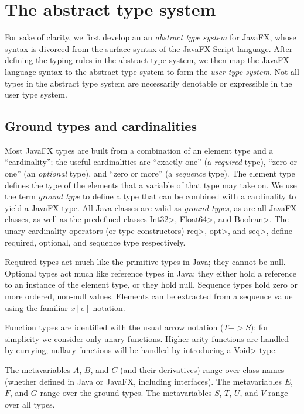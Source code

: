 \documentclass{article}
\begin{document}
\section{The abstract type system}

For sake of clarity, we first develop an an \emph{abstract type
system} for JavaFX, whose syntax is divorced from the surface syntax
of the JavaFX Script language.  After defining the typing rules in the
abstract type system, we then map the JavaFX language syntax to the
abstract type system to form the \emph{user type system}.  Not all
types in the abstract type system are necessarily denotable or
expressible in the user type system.

\subsection{Ground types and cardinalities}

Most JavaFX types are built from a combination of an element type and
a ``cardinality''; the useful cardinalities are ``exactly one'' (a
\emph{required} type), ``zero or one'' (an \emph{optional} type), and
``zero or more'' (a \emph{sequence} type).  The element type defines
the type of the elements that a variable of that type may take on.  We
use the term \emph{ground type} to define a type that can be combined
with a cardinality to yield a JavaFX type.  All Java classes are valid
as \emph{ground types}, as are all JavaFX classes, as well as the
predefined classes \<Int32>, \<Float64>, and \<Boolean>.  The unary
cardinality operators (or type constructors) \<req>, \<opt>, and
\<seq>, define required, optional, and sequence type respectively.

Required types act much like the primitive types in Java; they cannot
be null.  Optional types act much like reference types in Java; they
either hold a reference to an instance of the element type, or they
hold null.  Sequence types hold zero or more ordered, non-null values.
Elements can be extracted from a sequence value using the familiar
$x[e]$ notation.  

Function types are identified with the usual arrow notation ($T ->
S$); for simplicity we consider only unary functions.  Higher-arity
functions are handled by currying; nullary functions will be handled
by introducing a \<Void> type.

The metavariables $A$, $B$, and $C$ (and their derivatives) range over
class names (whether defined in Java or JavaFX, including interfaces).
The metavariables $E$, $F$, and $G$ range over the ground types.  The
metavariables $S$, $T$, $U$, and $V$ range over all types.
\end{document}
